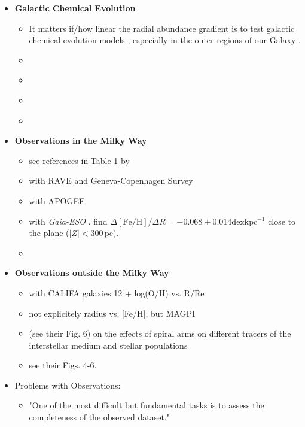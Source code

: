 \documentclass[fleqn,usenatbib]{mnras}
\begin{document}
\begin{itemize}
    \item \textbf{Galactic Chemical Evolution}
    \begin{itemize}
        \item It matters if/how linear the radial abundance gradient is to test galactic chemical evolution models \citep[see e.g.][]{Chiappini2001}, especially in the outer regions of our Galaxy \citep{Chiappini2002}.
        \item \citet{Minchev2014b}
        \item \citet{Kubryk2015}
        \item \citet{Stanghellini2015}
        \item \citet{Matteucci2001b}
    \end{itemize}
    \item \textbf{Observations in the Milky Way}
    \begin{itemize}
        \item see references in Table 1 by \citet{Chiappini2001}
        \item with RAVE and Geneva-Copenhagen Survey \citep{Boeche2013}
        \item with APOGEE \citep{Anders2014, Cunha2016} 
        \item with \textit{Gaia-ESO} \citep{Bergemann2014}. \citet{Bergemann2014} find $\Delta \mathrm{[Fe/H]} / \Delta R = -0.068 \pm 0.014 \mathrm{dex kpc^{-1}}$ close to the plane ($\vert Z \vert < 300\,\mathrm{pc}$).
        \item \citet{Willett2023}
    \end{itemize}
    \item \textbf{Observations outside the Milky Way}
    \begin{itemize}
        \item \citet[][see their Figs. 5 and 11]{Sanchez2014} with CALIFA galaxies 12 + log(O/H) vs. R/Re
        \item \citet{Mun2024} not explicitely radius vs. [Fe/H], but MAGPI
        \item \citet{Chen2024} (see their Fig. 6) on the effects of spiral arms on different tracers of the interstellar medium and stellar populations
        \item \citet{Chen2023} see their Figs. 4-6.
    \end{itemize}
    \item Problems with Observations:
    \begin{itemize}
        \item "One of the most difficult but fundamental tasks is to assess the completeness of the observed dataset." \citep{Bergemann2014}

\end{itemize}
\end{itemize}
\end{document}
